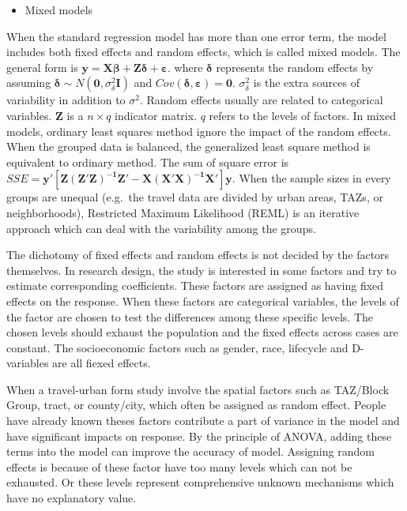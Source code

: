 \documentclass[
  11pt,
  openany]{memoir}
\providecommand{\tightlist}{%
  \setlength{\itemsep}{0pt}\setlength{\parskip}{0pt}}
\begin{document}
\begin{itemize}
\tightlist
\item
  Mixed models
\end{itemize}

When the standard regression model has more than one error term, the model includes both fixed effects and random effects, which is called mixed models.
The general form is \(\mathbf{y}=\mathbf{X}\boldsymbol{\beta}+\mathbf{Z}\boldsymbol{\delta}+\boldsymbol{\varepsilon}\).
where \(\boldsymbol{\delta}\) represents the random effects by assuming \(\boldsymbol{\delta}\sim N(\mathbf{0}, \sigma_\delta^2\mathbf{I})\) and \(Cov(\boldsymbol{\delta},\boldsymbol{\varepsilon})=\mathbf{0}\).
\(\sigma_\delta^2\) is the extra sources of variability in addition to \(\sigma^2\).
Random effects usually are related to categorical variables.
\(\mathbf{Z}\) is a \(n\times q\) indicator matrix. \(q\) refers to the levels of factors.
In mixed models, ordinary least squares method ignore the impact of the random effects.
When the grouped data is balanced, the generalized least square method is equivalent to ordinary method.
The sum of square error is \(SSE=\mathbf{y'[Z(Z'Z)^{-1}Z'-X(X'X)^{-1}X']y}\).
When the sample sizes in every groups are unequal (e.g.~the travel data are divided by urban areas, TAZs, or neighborhoods),
Restricted Maximum Likelihood (REML) is an iterative approach which can deal with the variability among the groups.

The dichotomy of fixed effects and random effects is not decided by the factors themselves.
In research design, the study is interested in some factors and try to estimate corresponding coefficients.
These factors are assigned as having fixed effects on the response.
When these factors are categorical variables, the levels of the factor are chosen to test the differences among these specific levels. The chosen levels should exhaust the population and the fixed effects across cases are constant. The socioeconomic factors such as gender, race, lifecycle and D-variables are all fiexed effects.

When a travel-urban form study involve the spatial factors such as TAZ/Block Group, tract, or county/city, which often be assigned as random effect.
People have already known theses factors contribute a part of variance in the model and have significant impacts on response. By the principle of ANOVA, adding these terms into the model can improve the accuracy of model.
Assigning random effects is because of these factor have too many levels which can not be exhausted.
Or these levels represent comprehensive unknown mechanisms which have no explanatory value.
\end{document}
